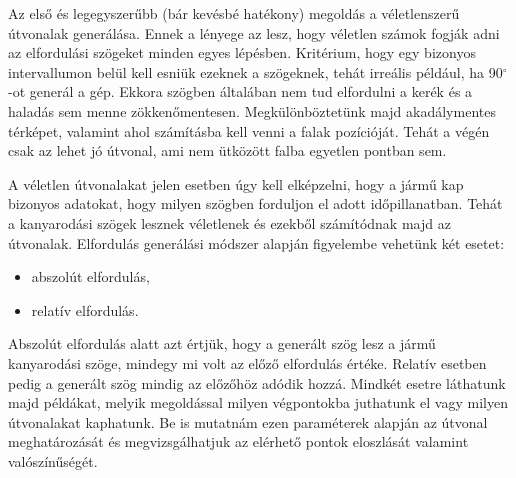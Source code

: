 

Az első és legegyszerűbb (bár kevésbé hatékony) megoldás a véletlenszerű útvonalak generálása. Ennek a lényege az lesz, hogy véletlen számok fogják adni az elfordulási szögeket minden egyes lépésben. Kritérium, hogy egy bizonyos intervallumon belül kell esniük ezeknek a szögeknek, tehát irreális például, ha 90$^\circ$-ot generál a gép. Ekkora szögben általában nem tud elfordulni a kerék és a haladás sem menne zökkenőmentesen. Megkülönböztetünk majd akadálymentes térképet, valamint ahol számításba kell venni a falak pozícióját. Tehát a végén csak az lehet jó útvonal, ami nem ütközött falba egyetlen pontban sem.\\


A véletlen útvonalakat jelen esetben úgy kell elképzelni, hogy a jármű kap bizonyos adatokat, hogy milyen szögben forduljon el adott időpillanatban. Tehát a kanyarodási szögek lesznek véletlenek és ezekből számítódnak majd az útvonalak. Elfordulás generálási módszer alapján figyelembe vehetünk két esetet:
\begin{itemize}
	\item abszolút elfordulás,
	\item relatív elfordulás.
\end{itemize}
Abszolút elfordulás alatt azt értjük, hogy a generált szög lesz a jármű kanyarodási szöge, mindegy mi volt az előző elfordulás értéke. Relatív esetben pedig a generált szög mindig az előzőhöz adódik hozzá. Mindkét esetre láthatunk majd példákat, melyik megoldással milyen végpontokba juthatunk el vagy milyen útvonalakat kaphatunk. Be is mutatnám ezen paraméterek alapján az útvonal meghatározását és megvizsgálhatjuk az elérhető pontok eloszlását valamint valószínűségét.


